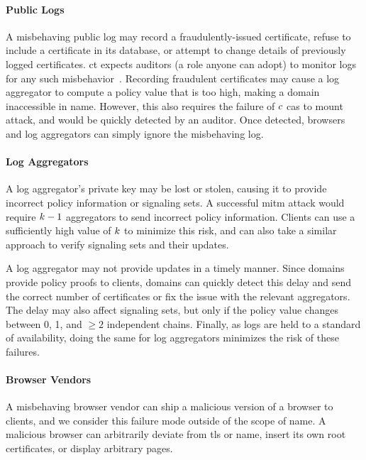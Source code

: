 \paragraph{Public Logs}
A misbehaving public log may record a fraudulently-issued certificate, refuse
to include a certificate in its database, or attempt to change details of
previously logged certificates. \ac{ct} expects auditors (a role anyone can adopt) to
monitor logs for any such misbehavior~\cite{rfc6962}. 
Recording fraudulent certificates may cause a log
aggregator to compute a policy value that is too high, making a domain
inaccessible in \ac{name}. However, this also requires the failure of $c$
\acp{ca} to mount  attack, and would be quickly detected by an
auditor. Once detected, browsers and log aggregators can simply ignore the
misbehaving log.

\paragraph{Log Aggregators}
A log aggregator's private key may be lost or stolen, causing it to
provide incorrect policy information or signaling sets. A successful \ac{mitm}
attack would require $k - 1$ aggregators to send incorrect policy
information. Clients can use a sufficiently high value of $k$ to minimize
this risk, and can also take a similar approach to verify signaling sets and
their updates.

A log aggregator may not provide updates in a timely manner.
Since domains provide policy proofs to clients,
domains can quickly detect this delay and send the correct
number of certificates or fix the issue with the relevant aggregators. The
delay may also affect signaling sets, but only if the policy value changes
between 0, 1, and $\ge 2$ independent chains. Finally, as logs are held to a standard of
availability, doing the same for log aggregators minimizes the risk of these
failures.

\paragraph{Browser Vendors}
A misbehaving browser vendor can ship a malicious version of a browser to
clients, and we consider this failure mode outside of the scope of \ac{name}. A
malicious browser can arbitrarily deviate from \ac{tls} or \ac{name}, insert
its own root certificates, or display arbitrary pages. 

